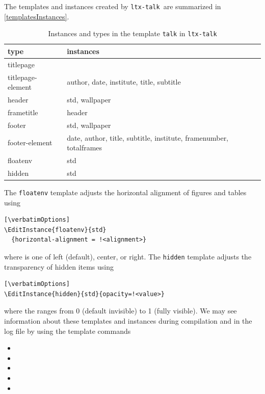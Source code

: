 \documentclass{ltugboat}
\newcommand{\verbatimOptions}{%
 \IfDocumentMetadataT{setup-code=}\small\makevmeta}
\newcommand{\ltxtalk}{\texttt{ltx-talk}}
\begin{document}
The templates and instances created by \ltxtalk\ are
summarized in \autoref{templatesInstances}.
\begin{table}
\caption{Instances and types in the template \texttt{talk} in \ltxtalk}
\label{templatesInstances}
\centering
\begin{tabularx}{\linewidth}{l >{\raggedright} X}\toprule
type & instances \\\midrule
titlepage & \\
titlepage-element & author, date, institute, title, subtitle\\
header & std, wallpaper \\
frametitle & header \\
footer & std, wallpaper \\
footer-element
& date, author, title, subtitle, institute, framenumber, totalframes \\
floatenv & std\\
hidden & std \\
\bottomrule
\end{tabularx}
\end{table}
The \texttt{floatenv} template adjusts the horizontal alignment
of figures and tables using
\begin{verbatim}[\verbatimOptions]
\EditInstance{floatenv}{std}
  {horizontal-alignment = !<alignment>}
\end{verbatim}
where  is one of left (default), center, or right.
The \texttt{hidden} template adjusts the transparency of hidden items using
\begin{verbatim}[\verbatimOptions]
\EditInstance{hidden}{std}{opacity=!<value>}
\end{verbatim}
where the  ranges from 0 (default invisible) to 1 (fully visible).
We may see information about these templates and instances during compilation
and in the log file by using the template commands
\begin{itemize}
\item{}
\item{}
\item{}
\item{}
\item{}
\end{itemize}
\end{document}
